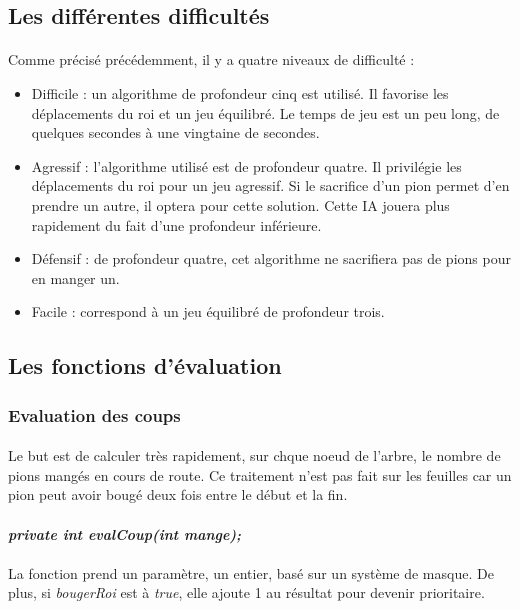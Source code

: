 \documentclass[11pt]{article} %
\begin{document}
\subsection{Les différentes difficultés}
\paragraph{}
Comme précisé précédemment, il y a quatre niveaux de difficulté :
\begin{itemize}
\item Difficile : un algorithme de profondeur cinq est utilisé. Il favorise les déplacements du roi et un jeu équilibré. Le temps de jeu est un peu long, de quelques secondes à une vingtaine de secondes.
\item Agressif : l'algorithme utilisé est de profondeur quatre. Il privilégie les déplacements du roi pour un jeu agressif. Si le sacrifice d'un pion permet d'en prendre un autre, il optera pour cette solution. Cette IA jouera plus rapidement du fait d'une profondeur inférieure.
\item Défensif : de profondeur quatre, cet algorithme ne sacrifiera pas de pions pour en manger un.
\item Facile : correspond à un jeu équilibré de profondeur trois.
\end{itemize}

\subsection{Les fonctions d'évaluation}

\subsubsection{Evaluation des coups}
\paragraph{}
Le but est de calculer très rapidement, sur chque noeud de l'arbre, le nombre de pions mangés en cours de route. Ce traitement n'est pas fait sur les feuilles car un pion peut avoir bougé deux fois entre le début et la fin.
\paragraph{}
\textit{\textbf{private int evalCoup(int mange);}}
\paragraph{}
La fonction prend un paramètre, un entier, basé sur un système de masque. De plus, si \textit{bougerRoi} est à \textit{true}, elle ajoute 1 au résultat pour devenir prioritaire.
\end{document}
